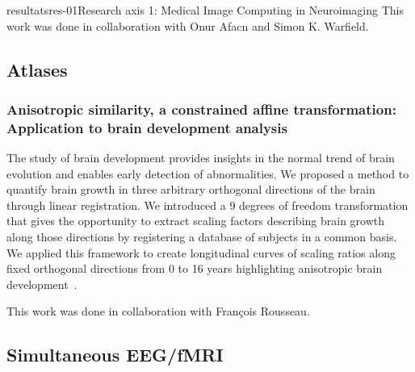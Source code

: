\documentclass{ra2018}
\begin{document}
\begin{module}{resultats}{res-01}{Research axis 1: Medical Image Computing in Neuroimaging}
This work was done in collaboration with Onur Afacn and Simon K. Warfield.

\subsection{Atlases}
\subsubsection{Anisotropic similarity, a constrained affine transformation: Application to brain development analysis}
\begin{participants}
\end{participants}
The study of brain development provides insights in the normal trend of brain evolution and enables early detection of abnormalities. We proposed a method to quantify brain growth in three arbitrary orthogonal directions of the brain through linear registration. We introduced a 9 degrees of freedom transformation that gives the opportunity to extract scaling factors describing brain growth along those directions by registering a database of subjects in a common basis. We applied this framework to create longitudinal curves of scaling ratios along fixed orthogonal directions from 0 to 16 years highlighting anisotropic brain development~\cite{legouhy:inserm-01871274}.

This work was done in collaboration with François Rousseau.

\subsection{Simultaneous EEG/fMRI}


\end{module}
\end{document}
